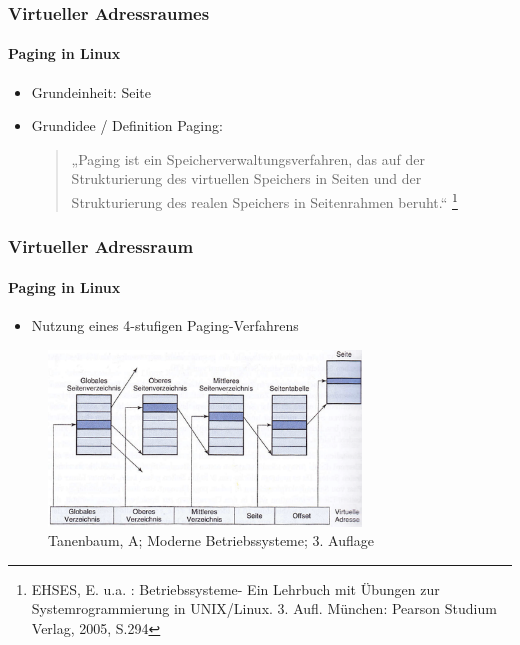 \documentclass[ddcfooter,nosectionnum]{tudbeamer}
\begin{document}
\begin{frame}
    \frametitle{Virtueller Adressraumes}
    \framesubtitle {Paging in Linux}
    \begin{itemize}
         \item  Grundeinheit: Seite
         \item Grundidee / Definition Paging: \\
        \begin{quote}
         „Paging ist ein Speicherverwaltungsverfahren, das auf der Strukturierung  des virtuellen Speichers 	in Seiten und der Strukturierung des realen Speichers in Seitenrahmen beruht.“
         \footnote{EHSES, E. u.a. : Betriebssysteme- Ein Lehrbuch mit Übungen zur Systemrogrammierung in UNIX/Linux. 3. Aufl. München: Pearson Studium Verlag, 2005, S.294}
	\end{quote}
 \end{itemize}
    
\end{frame}


\begin{frame}
    \frametitle{Virtueller Adressraum}
    \framesubtitle {Paging in Linux}
    \begin{itemize}
         \item Nutzung eines 4-stufigen Paging-Verfahrens
        
    \end{itemize}
    \begin{figure}[p]  
    \includegraphics[width=8.3cm]{vierstufiges.png}
    \caption{ Tanenbaum, A; Moderne Betriebssysteme; 3. Auflage}
     \end{figure}
\end{frame}
\end{document}
